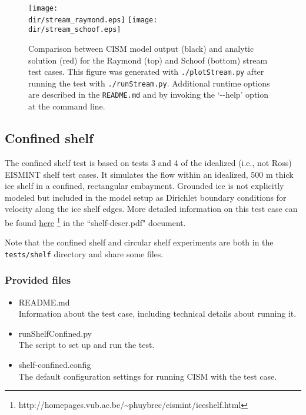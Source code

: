 	
\begin{figure}[H]
  \begin{center}
	\texttt{[image: \\dir/stream\_raymond.eps]}
	\texttt{[image: \\dir/stream\_schoof.eps]}
  \end{center}
  \caption{Comparison between CISM model output (black) and analytic solution (red) for the Raymond (top) and Schoof (bottom) stream test cases. This figure was generated with \texttt{./plotStream.py} after running the test with \texttt{./runStream.py}.
Additional runtime options are described in the \texttt{README.md} and by invoking the `-{}-help' option at the command line.}
  \label{fig:stream-results}
\end{figure} 

\subsection{Confined shelf}
The confined shelf test is based on tests 3 and 4 of the idealized (i.e., not Ross) EISMINT shelf test 
cases.  It simulates the flow within an idealized, 500 m thick ice shelf in a 
confined, rectangular embayment.  Grounded ice is not explicitly modeled but included in the 
model setup as Dirichlet boundary conditions for velocity along the ice shelf edges.
More detailed information on this test case can be found 
\href{http://homepages.vub.ac.be/~phuybrec/eismint/iceshelf.html}{here}
\footnote{http://homepages.vub.ac.be/\textasciitilde{}phuybrec/eismint/iceshelf.html} in the 
``shelf-descr.pdf" document.

Note that the confined shelf and circular shelf experiments are both in the 
\texttt{tests/shelf} directory and share some files.

\subsubsection{Provided files}

\begin{itemize}
	\item README.md \\
		Information about the test case, including technical details about running it.
	\item runShelfConfined.py \\
		The script to set up and run the test.
	\item shelf-confined.config \\
  The default configuration settings for running CISM with the test case.
\end{itemize}

